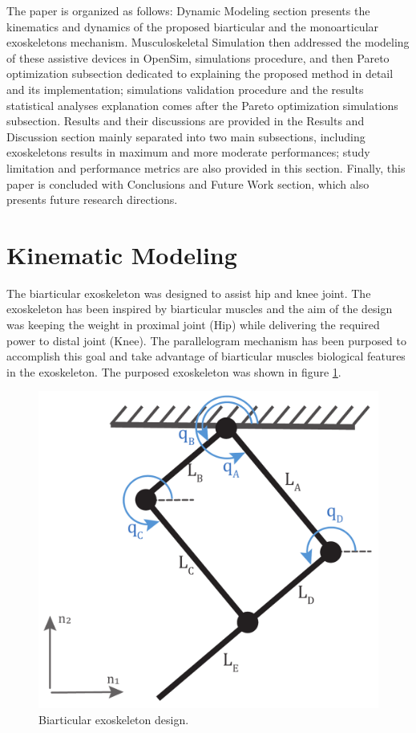 \documentclass[10pt,letterpaper]{article}
\begin{document}
The paper is organized as follows: Dynamic Modeling section presents the kinematics and dynamics of the proposed biarticular and the monoarticular exoskeletons mechanism. Musculoskeletal Simulation then addressed the modeling of these assistive devices in OpenSim, simulations procedure, and then Pareto optimization subsection dedicated to explaining the proposed method in detail and its implementation; simulations validation procedure and the results statistical analyses explanation comes after the Pareto optimization simulations subsection. Results and their discussions are provided in the Results and Discussion section mainly separated into two main subsections, including exoskeletons results in maximum and more moderate performances; study limitation and performance metrics are also provided in this section. Finally, this paper is concluded with Conclusions and Future Work section, which also presents future research directions.
\section*{\textbf{Kinematic Modeling}}
The biarticular exoskeleton was designed to assist hip and knee joint. The exoskeleton has been inspired by biarticular muscles and the aim of the design was keeping the weight in proximal joint (Hip) while delivering the required power to distal joint (Knee). The parallelogram mechanism has been purposed to accomplish this goal and take advantage of biarticular muscles biological features in the exoskeleton.  The purposed exoskeleton was shown in figure \ref{Fig_Biarticular_Exo_Mechanism}.
\begin{figure}[h!]
	\centering
	\includegraphics[width=2 in]{Cartoons/Biarticular_Exo_Mechanism.pdf}
	\caption{Biarticular exoskeleton design.}
	\label{Fig_Biarticular_Exo_Mechanism}
\end{figure}
\end{document}

